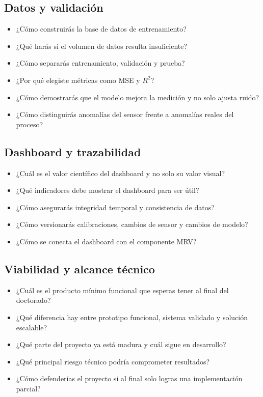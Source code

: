 \documentclass[11pt]{article}
\begin{document}
\subsection*{Datos y validación}
\begin{itemize}[leftmargin=*]
    \item ¿Cómo construirás la base de datos de entrenamiento?
    \item ¿Qué harás si el volumen de datos resulta insuficiente?
    \item ¿Cómo separarás entrenamiento, validación y prueba?
    \item ¿Por qué elegiste métricas como MSE y \(R^2\)?
    \item ¿Cómo demostrarás que el modelo mejora la medición y no solo ajusta ruido?
    \item ¿Cómo distinguirás anomalías del sensor frente a anomalías reales del proceso?
\end{itemize}

\subsection*{Dashboard y trazabilidad}
\begin{itemize}[leftmargin=*]
    \item ¿Cuál es el valor científico del dashboard y no solo su valor visual?
    \item ¿Qué indicadores debe mostrar el dashboard para ser útil?
    \item ¿Cómo asegurarás integridad temporal y consistencia de datos?
    \item ¿Cómo versionarás calibraciones, cambios de sensor y cambios de modelo?
    \item ¿Cómo se conecta el dashboard con el componente MRV?
\end{itemize}

\subsection*{Viabilidad y alcance técnico}
\begin{itemize}[leftmargin=*]
    \item ¿Cuál es el producto mínimo funcional que esperas tener al final del doctorado?
    \item ¿Qué diferencia hay entre prototipo funcional, sistema validado y solución escalable?
    \item ¿Qué parte del proyecto ya está madura y cuál sigue en desarrollo?
    \item ¿Qué principal riesgo técnico podría comprometer resultados?
    \item ¿Cómo defenderías el proyecto si al final solo logras una implementación parcial?
\end{itemize}
\end{document}
